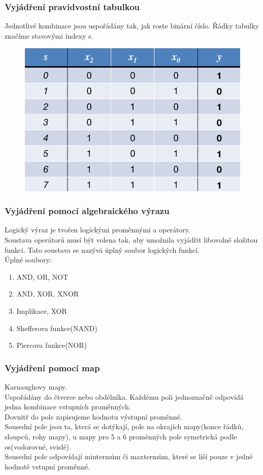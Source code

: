 \subsubsection{Vyjádření pravidvostní tabulkou}
Jednotlivé kombinace jsou uspořádány tak, jak roste binární číslo. Řádky tabulky značíme stavovými indexy s.
\begin{figure}
    \centering
    \includegraphics[scale = 0.4]{img/PravTabulka.png}
\end{figure}

\subsubsection{Vyjádření pomocí algebraického výrazu}
Logický výraz je tvořen logickými proměnnými a operátory.\\
Soustava operátorů musí být volena tak, aby umožnila vyjádřit libovolně složitou funkci. Tato soustava se nazývá úplný soubor logických funkcí. \\
Úplné soubory:
\begin{enumerate}
    \item AND, OR, NOT
    \item AND, XOR, XNOR
    \item Implikace, XOR
    \item Shefferova funkce(NAND)
    \item Piercova funkce(NOR)
\end{enumerate}

\subsubsection{Vyjádření pomocí map}
Karnaughovy mapy.\\
Uspořádány do čtverce nebo obdélníka. Každému poli jednoznačně odpovídá jedna kombinace vstupních proměnných. \\
Dovnitř do pole zapisujeme hodnotu výstupní proměnné.\\
Sousední pole jsou ta, která se dotýkají, pole na okrajích mapy(konce řádků, sloupců, rohy mapy), u mapy pro 5 a 6 proměnných pole symetrická podle os(vodorovné, svislé).\\
Sousední pole odpovídají mintermům či maxtermům, které se liší pouze v jedné hodnotě vstupní proměnné.\\
